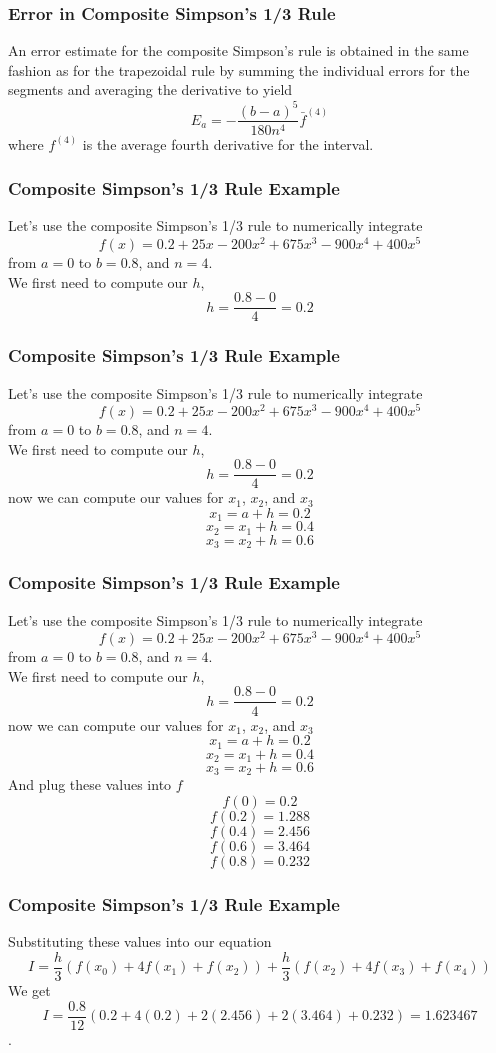 \documentclass{if-beamer}
\begin{document}
\begin{frame}
	\frametitle{Error in Composite Simpson's 1/3 Rule}
	An error estimate for the composite Simpson’s rule is obtained in the same fashion as
	for the trapezoidal rule by summing the individual errors for the segments and averaging
	the derivative to yield
	$$ E_a = -\frac{(b-a)^5}{180n^4}\bar{f}^{(4)}$$
	where $f^{(4)}$ is the average fourth derivative for the interval.
\end{frame}

\begin{frame}[t]
	\frametitle{Composite Simpson’s 1/3 Rule Example}
	Let's use the composite Simpson's 1/3 rule to numerically integrate
	$$f(x) =0.2+25x-200x^2+675x^3-900x^4+400x^5$$
	from $a = 0$ to $b=0.8$, and $n =4$. \\\vspace{5pt}
	We first need to compute our $h$,
	$$h = \frac{0.8-0}{4} = 0.2$$

\end{frame}

\begin{frame}[t]
	\frametitle{Composite Simpson’s 1/3 Rule Example}
	Let's use the composite Simpson's 1/3 rule to numerically integrate
	$$f(x) =0.2+25x-200x^2+675x^3-900x^4+400x^5$$
	from $a = 0$ to $b=0.8$, and $n =4$. \\\vspace{5pt}
	We first need to compute our $h$,
	$$h = \frac{0.8-0}{4} = 0.2$$
	now we can compute our values for $x_1$, $x_2$, and $x_3$
	$$x_1 = a+h = 0.2$$
	$$x_2 = x_1 + h =0.4$$
	$$x_3 = x_2 +h = 0.6$$

\end{frame}

\begin{frame}[t]
	\frametitle{Composite Simpson’s 1/3 Rule Example}
	Let's use the composite Simpson's 1/3 rule to numerically integrate
	$$f(x) =0.2+25x-200x^2+675x^3-900x^4+400x^5$$
	from $a = 0$ to $b=0.8$, and $n =4$. \\\vspace{5pt}
	We first need to compute our $h$,
	$$h = \frac{0.8-0}{4} = 0.2$$
	now we can compute our values for $x_1$, $x_2$, and $x_3$
	$$x_1 = a+h = 0.2$$
	$$x_2 = x_1 + h =0.4$$
	$$x_3 = x_2 +h = 0.6$$
	And plug these values into $f$
	$$f(0) = 0.2$$
	$$f(0.2) = 1.288$$
	$$f(0.4) = 2.456$$
	$$f(0.6) = 3.464$$
	$$f(0.8) = 0.232$$
\end{frame}

\begin{frame}[t]
	\frametitle{Composite Simpson’s 1/3 Rule Example}
	Substituting these values into our equation
	$$I = \frac{h}{3}(f(x_0)+4f(x_1)+f(x_2)) + \frac{h}{3}(f(x_2)+4f(x_3)+f(x_4))$$
	We get
	$$I = \frac{0.8}{12}(0.2+4(0.2)+2(2.456)+2(3.464)+0.232) = 1.623467$$. 
\end{frame}
\end{document}
